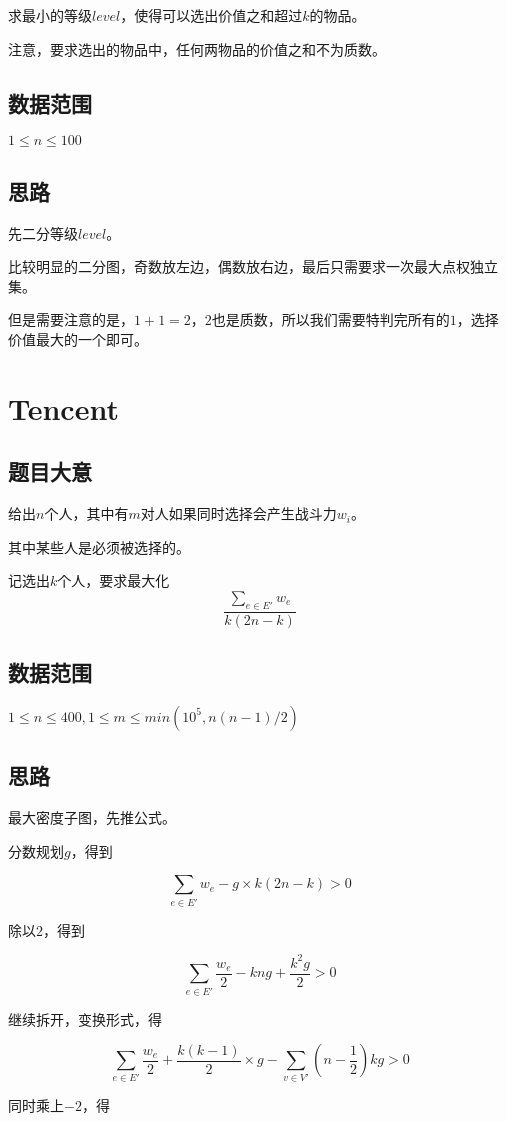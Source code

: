 \documentclass{ctexart}
\numberwithin{equation}{section}
\begin{document}
\begin{flushleft}
  求最小的等级$level$，使得可以选出价值之和超过$k$的物品。

  注意，要求选出的物品中，任何两物品的价值之和不为质数。
  
  \subsection{数据范围}
  $1\le n \le 100$
  \subsection{思路}
  先二分等级$level$。
  
  比较明显的二分图，奇数放左边，偶数放右边，最后只需要求一次最大点权独立集。

  但是需要注意的是，$1+1=2$，$2$也是质数，所以我们需要特判完所有的$1$，选择价值最大的一个即可。
  
  \newpage

  \section{Tencent}
  \subsection{题目大意}
  给出$n$个人，其中有$m$对人如果同时选择会产生战斗力$w_i$。

  其中某些人是必须被选择的。

  记选出$k$个人，要求最大化$$\frac{\sum_{e\in E'}w_e}{k(2n-k)}$$
  
  \subsection{数据范围}
  $1\le n \le 400,1\le m\le min(10^5, n(n-1)/2)$
  \subsection{思路}
  最大密度子图，先推公式。

  分数规划$g$，得到

  $$\sum_{e\in E'}w_e-g\times k(2n-k)>0$$

  除以$2$，得到

  $$\sum_{e\in E'}\frac{w_e}{2}-kng+\frac{k^2g}{2} > 0$$
  
  继续拆开，变换形式，得

  $$\sum_{e\in E'}\frac{w_e}{2}+\frac{k(k-1)}{2}\times g-\sum_{v\in V'}(n-\frac{1}{2})kg >0$$

  同时乘上$-2$，得


\end{flushleft}
\end{document}
